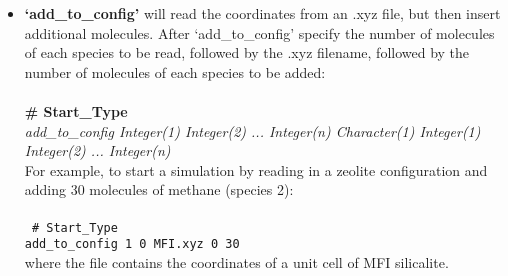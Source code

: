 \begin{itemize}
{\# Start\_Type \\
read\_config 50 50 liquid.xyz \\}
%
If the simulation also has a second box with 10 molecules of species 1 and 90 molecules of species 2: \\ \\ 
%
\texttt{
\# Start\_Type \\
read\_config 50 50 liquid.xyz \\
read\_config 10 90 vapor.xyz \\}
%
The .xyz files must have the following format:\\
%
\texttt{
 <number of atoms>\\
 comment line\\
 <element> <x> <y> <z>\\
 ...\\
}
%
The utility \texttt{read\_config.py} is provided to speed up the restart of simulations using the `read\_config' option.
This tool extracts the last configuration from a previous run, as well as relevant information from the checkpoint file 
such as maximum displacements for angles or translations. It then creates new input and xyz files that can readily be
used to restart a simulation using the `read\_config' option. This script is located in \texttt{Scripts/Read\_Config}. 
For more information, refer to the README file located in the same directory.

\item {\textbf{`add\_to\_config'}} will read the coordinates from an .xyz file, but then insert additional molecules.
After `add\_to\_config' specify the number of molecules of each species to be read, followed by the .xyz filename, 
followed by the number of molecules of each species to be added: \\ \\
%
{\bf \# Start\_Type} \\
{\it add\_to\_config Integer(1) Integer(2) ... Integer(n) Character(1) Integer(1) Integer(2) ... Integer(n)}\\
%
For example, to start a simulation by reading in a zeolite configuration and adding 30 molecules of methane (species 2): \\ \\
%
\texttt{
\# Start\_Type \\
add\_to\_config  1  0 MFI.xyz 0 30 \\}
%
where the file  contains the coordinates of a unit cell of MFI silicalite.


\end{itemize}
